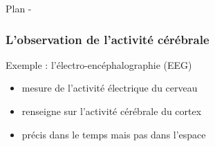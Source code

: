 \documentclass{beamer}
\begin{document}
\begin{frame}{Plan - \secname}
    \tableofcontents[sectionstyle=hide/hide,subsectionstyle=show/shaded/hide ]
\end{frame}


\begin{frame}
\frametitle{L'observation de l'activité cérébrale}
Exemple : l'électro-encéphalographie (EEG)
\begin{itemize}
	\item mesure de l'activité électrique du cerveau
	\item renseigne sur l'activité cérébrale du cortex
	\item précis dans le temps mais pas dans l'espace           %
\end{itemize}
~\\


\begin{figure}
    \centering
    ~~~
    ~~~
\end{figure}

\end{frame}
\end{document}

